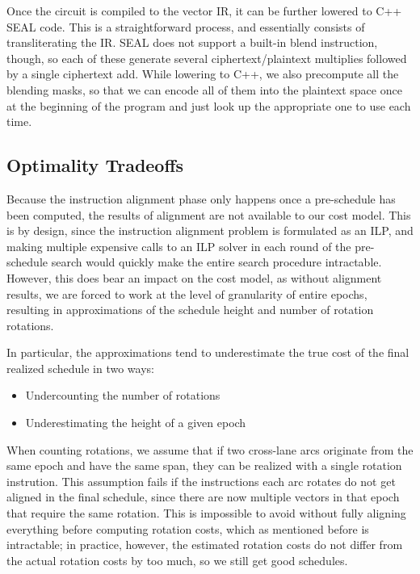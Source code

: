 Once the circuit is compiled to the vector IR, it can be further lowered to C++ SEAL code.
This is a straightforward process, and essentially consists of transliterating the IR. 
SEAL does not support a built-in blend instruction, though, so each of these generate several ciphertext/plaintext multiplies followed by a single ciphertext add.
While lowering to C++, we also precompute all the blending masks, so that we can encode all of them into the plaintext space once at the beginning of the program and just look up the appropriate one to use each time.

\subsection{Optimality Tradeoffs}\label{sec:optimality-tradeoffs} 
Because the instruction alignment phase only happens once a pre-schedule has been computed, the results of alignment are not available to our cost model.
This is by design, since the instruction alignment problem is formulated as an ILP, and making multiple expensive calls to an ILP solver in each round of the pre-schedule search would quickly make the entire search procedure intractable.
However, this does bear an impact on the cost model, as without alignment results, we are forced to work at the level of granularity of entire epochs, resulting in approximations of the schedule height and number of rotation rotations.

In particular, the approximations tend to underestimate the true cost of the final realized schedule in two ways:
\begin{itemize}
    \item Undercounting the number of rotations
    \item Underestimating the height of a given epoch
\end{itemize}

When counting rotations, we assume that if two cross-lane arcs originate from the same epoch and have the same span, they can be realized with a single rotation instrution.
This assumption fails if the instructions each arc rotates  do not get aligned in the final schedule, since there are now multiple vectors in that epoch that require the same rotation.
This is impossible to avoid without fully aligning everything before computing rotation costs, which as mentioned before is intractable; in practice, however, the estimated rotation costs do not differ from the actual rotation costs by too much, so we still get good schedules. 

